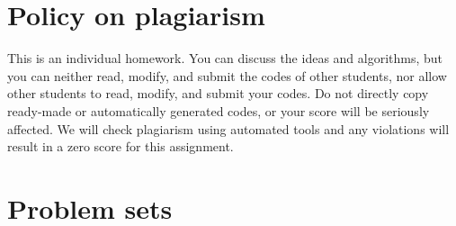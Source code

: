 \documentclass[11pt,letterpaper]{article}
\begin{document}
\section{Policy on plagiarism}
This is an individual homework. You can discuss the ideas and algorithms, but you can neither read, modify, and submit the codes of other students, nor allow other students to read, modify, and submit your codes. Do not directly copy ready-made or automatically generated codes, or your score will be seriously affected. We will check plagiarism using automated tools and any violations will result in a zero score for this assignment. 

\clearpage

\section{Problem sets}
\end{document}
